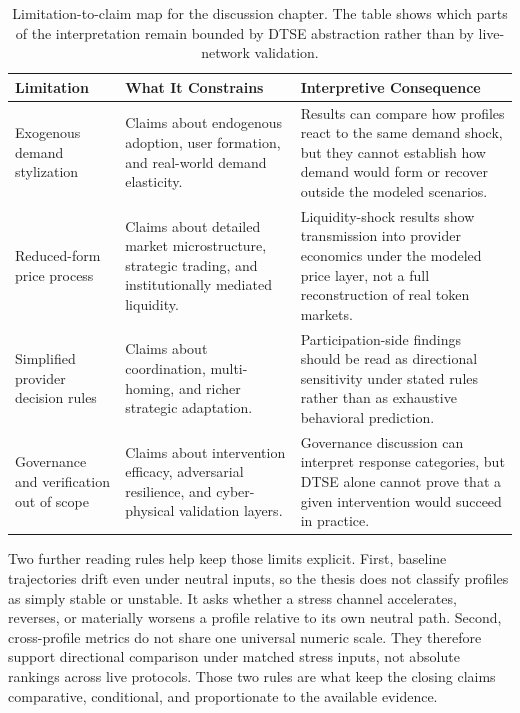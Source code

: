 \begin{table}[ht]
    \centering
    \footnotesize
    \setlength{\tabcolsep}{4pt}
    \renewcommand{\arraystretch}{1.15}
    \begin{tabularx}{\textwidth}{@{}>{\raggedright\arraybackslash}p{}>{\raggedright\arraybackslash}p{}X@{}}
        \toprule
        \textbf{Limitation} & \textbf{What It Constrains} & \textbf{Interpretive Consequence} \\
        \midrule
        Exogenous demand stylization & Claims about endogenous adoption, user formation, and real-world demand elasticity. & Results can compare how profiles react to the same demand shock, but they cannot establish how demand would form or recover outside the modeled scenarios. \\
        \addlinespace
        Reduced-form price process & Claims about detailed market microstructure, strategic trading, and institutionally mediated liquidity. & Liquidity-shock results show transmission into provider economics under the modeled price layer, not a full reconstruction of real token markets. \\
        \addlinespace
        Simplified provider decision rules & Claims about coordination, multi-homing, and richer strategic adaptation. & Participation-side findings should be read as directional sensitivity under stated rules rather than as exhaustive behavioral prediction. \\
        \addlinespace
        Governance and verification out of scope & Claims about intervention efficacy, adversarial resilience, and cyber-physical validation layers. & Governance discussion can interpret response categories, but DTSE alone cannot prove that a given intervention would succeed in practice. \\
        \bottomrule
    \end{tabularx}
    \caption[Limitation-to-claim map]{Limitation-to-claim map for the discussion chapter. The table shows which parts of the interpretation remain bounded by DTSE abstraction rather than by live-network validation.}
    \label{tab:limitation_claim_impact_map}
\end{table}

Two further reading rules help keep those limits explicit. First, baseline trajectories drift even under neutral inputs, so the thesis does not classify profiles as simply stable or unstable. It asks whether a stress channel accelerates, reverses, or materially worsens a profile relative to its own neutral path. Second, cross-profile metrics do not share one universal numeric scale. They therefore support directional comparison under matched stress inputs, not absolute rankings across live protocols. Those two rules are what keep the closing claims comparative, conditional, and proportionate to the available evidence.

